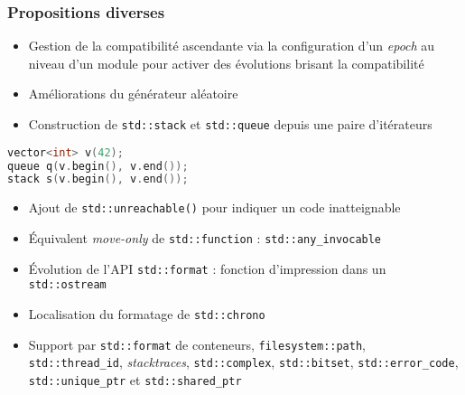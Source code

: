 \documentclass[C++.tex]{subfiles}
\begin{document}
\begin{frame}[fragile]
	\frametitle{Propositions diverses}
	\begin{itemize}
		\item Gestion de la compatibilité ascendante via la configuration d'un \textit{epoch} au niveau d'un module pour activer des évolutions brisant la compatibilité


		\item Améliorations du générateur aléatoire
		\item Construction de \lstinline|std::stack| et \lstinline|std::queue| depuis une paire d'itérateurs
	\end{itemize}

	\begin{lstlisting}[language=C++]
vector<int> v(42);
queue q(v.begin(), v.end());
stack s(v.begin(), v.end());\end{lstlisting}


	\begin{itemize}
		\item Ajout de \lstinline|std::unreachable()| pour indiquer un code inatteignable


		\item Équivalent \textit{move-only} de \lstinline|std::function| : \lstinline|std::any_invocable|
		\item Évolution de l'API \lstinline|std::format| : fonction d'impression dans un \lstinline|std::ostream|
		\item Localisation du formatage de \lstinline|std::chrono|
		\item Support par \lstinline|std::format| de conteneurs,  \lstinline|filesystem::path|, \lstinline|std::thread_id|, \textit{stacktraces}, \lstinline|std::complex|, \lstinline|std::bitset|, \lstinline|std::error_code|, \lstinline|std::unique_ptr| et \lstinline|std::shared_ptr|
	\end{itemize}
\end{frame}
\end{document}
